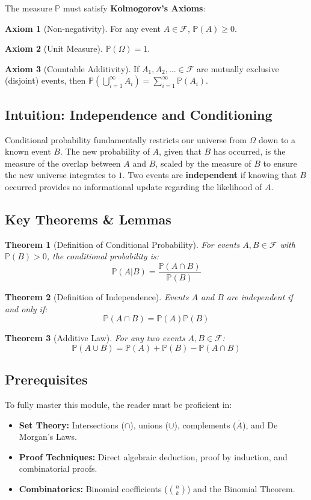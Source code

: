 \documentclass[11pt, letterpaper]{article}
\newtheorem{theorem}{Theorem}[section]
\theoremstyle{definition}
\newtheorem{axiom}{Axiom}[section]
\begin{document}
The measure $\mathbb{P}$ must satisfy \textbf{Kolmogorov's Axioms}:
\begin{axiom}[Non-negativity]
For any event $A \in \mathscr{F}$, $\mathbb{P}(A) \geq 0$.
\end{axiom}
\begin{axiom}[Unit Measure]
$\mathbb{P}(\Omega) = 1$.
\end{axiom}
\begin{axiom}[Countable Additivity]
If $A_1, A_2, \dots \in \mathscr{F}$ are mutually exclusive (disjoint) events, then $\mathbb{P} \left( \bigcup_{i=1}^\infty A_i \right) = \sum_{i=1}^\infty \mathbb{P}(A_i)$.
\end{axiom}

\subsection{Intuition: Independence and Conditioning}
Conditional probability fundamentally restricts our universe from $\Omega$ down to a known event $B$. The new probability of $A$, given that $B$ has occurred, is the measure of the overlap between $A$ and $B$, scaled by the measure of $B$ to ensure the new universe integrates to $1$. Two events are \textbf{independent} if knowing that $B$ occurred provides no informational update regarding the likelihood of $A$. 

\subsection{Key Theorems \& Lemmas}
\begin{theorem}[Definition of Conditional Probability]
For events $A, B \in \mathscr{F}$ with $\mathbb{P}(B) > 0$, the conditional probability is:
\[ \mathbb{P}(A|B) = \frac{\mathbb{P}(A \cap B)}{\mathbb{P}(B)} \]
\end{theorem}
\begin{theorem}[Definition of Independence]
Events $A$ and $B$ are independent if and only if:
\[ \mathbb{P}(A \cap B) = \mathbb{P}(A)\mathbb{P}(B) \]
\end{theorem}
\begin{theorem}[Additive Law]
For any two events $A, B \in \mathscr{F}$:
\[ \mathbb{P}(A \cup B) = \mathbb{P}(A) + \mathbb{P}(B) - \mathbb{P}(A \cap B) \]
\end{theorem}

\subsection{Prerequisites}
To fully master this module, the reader must be proficient in:
\begin{itemize}
    \item \textbf{Set Theory:} Intersections ($\cap$), unions ($\cup$), complements ($\overline{A}$), and De Morgan's Laws.
    \item \textbf{Proof Techniques:} Direct algebraic deduction, proof by induction, and combinatorial proofs.
    \item \textbf{Combinatorics:} Binomial coefficients ($\binom{n}{k}$) and the Binomial Theorem.
\end{itemize}
\end{document}
